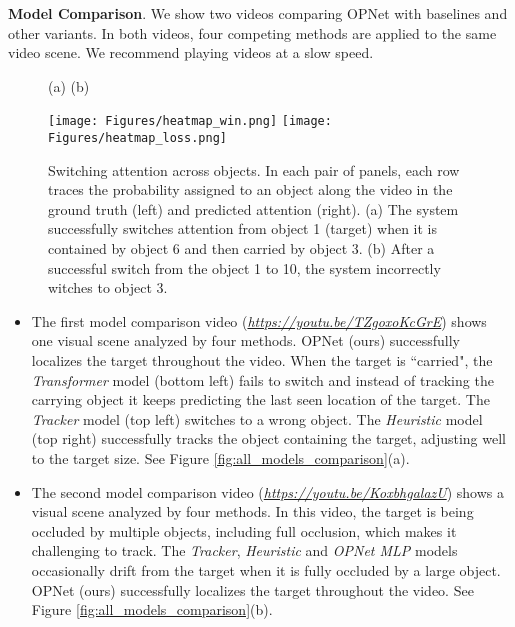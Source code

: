 \documentclass[]{llncs}
\newcommand{\figref}[1]{Figure \ref{#1}}
\begin{document}
\textbf{Model Comparison}. We show two videos comparing OPNet with baselines and other variants. In both videos, four competing methods are applied to the same video scene. We recommend playing videos at a slow speed.

\begin{figure}[h!]
    \hspace{85pt}(a) \hspace{150pt} (b)
    \begin{center}
    \texttt{[image: Figures/heatmap\_win.png]}
     \texttt{[image: Figures/heatmap\_loss.png]}
    \caption{Switching attention across objects. In each pair of panels, each row traces the probability assigned to an object along the video in the ground truth (left) and predicted attention (right). (a) The system successfully switches attention from object 1 (target) when it is contained by object 6 and then carried by object 3. (b) After a successful switch from the object 1 to 10, the system incorrectly witches to object 3.
    \label{fig:heat_map}}
    \end{center}
\end{figure}


\begin{itemize}
    \item The first model comparison video (\href{https://youtu.be/TZgoxoKcGrE}{\textit{https://youtu.be/TZgoxoKcGrE}})  shows one visual scene analyzed by four methods.
    OPNet (ours) successfully localizes the target throughout the video. When the target is ``carried", the \textit{Transformer} model (bottom left) fails to switch and instead of tracking the carrying object it keeps predicting the last seen location of the target. The \textit{Tracker} model (top left) switches to a wrong object. The \textit{Heuristic} model (top right) successfully tracks the object containing the target, adjusting well to the target size. See \figref{fig:all_models_comparison}(a).
    \item  The second model comparison video  (\href{https://youtu.be/KoxbhgalazU}{\textit{https://youtu.be/KoxbhgalazU}}) shows a visual scene analyzed by four methods. In this video, the target is being occluded by multiple objects, including full occlusion, which makes it challenging to track. 
    The \textit{Tracker}, \textit{Heuristic} and \textit{OPNet MLP} models occasionally drift from the target when it is fully occluded by a large object.
    OPNet (ours) successfully localizes the target throughout the video. See \figref{fig:all_models_comparison}(b).
\end{itemize}
 
\end{document}
